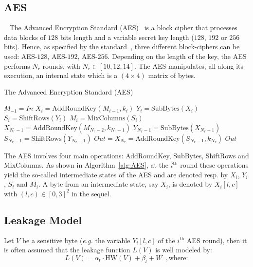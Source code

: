 \subsection{AES}~\label{ssec:AES}
The Advanced Encryption Standard (AES)~\cite{FIPS197} is a  block cipher that processes data blocks of $128$ bits length and a variable secret key length ($128$, $192$ or $256$ bits). Hence, as specified by the standard~\cite{FIPS197}, three different block-ciphers can be used: AES-$128$, AES-$192$, AES-$256$.
Depending on the length of the key, the AES performs $N_r$ rounds, with $N_r \in [10, 12, 14 ]$. The AES manipulates, all along its execution, an internal state which is a $(4 \times 4) $ matrix of bytes.

\begin{algorithm}[ht!]
	\caption{The Advanced Encryption Standard (AES)}\label{alg:AES}
	\begin{algorithmic}[1]
	\State $M_{-1} = In$	
		\State $X_i = \mbox{AddRoundKey}(M_{i-1},k_{i})$
		\State $Y_i = \mbox{SubBytes}(X_{i})$
		\State $S_i = \mbox{ShiftRows}(Y_{i})$
		\State $M_i = \mbox{MixColumns}(S_i)$
    \EndFor
    \State $X_{N_r-1} = \mbox{AddRoundKey}(M_{N_r-2}, k_{N_r-1})$
   	\State $Y_{N_r-1} = \mbox{SubBytes}(X_{N_r-1})$
	\State $S_{N_r-1} = \mbox{ShiftRows}(Y_{N_r-1})$
	\State $Out = X_{N_r} = \mbox{AddRoundKey}(S_{N_r-1}, k_{N_r})$
	\State \Return $Out$
  	\end{algorithmic}
\end{algorithm}

The AES involves four main operations: AddRoundKey, SubBytes, ShiftRows and MixColumns. As shown in Algorithm~\ref{alg:AES}, at the $i^{\text{th}}$ round these operations yield the so-called intermediate states of the AES and are denoted resp. by $X_i$, $Y_i$, $S_i$ and $M_i$. A byte from an intermediate state, say $X_i$, is denoted by ${X_i[l,c]}$ with $(l,c) \in {[0,3]}^2$ in the sequel.


\subsection{Leakage Model}\label{ssec:leak}
Let $V$ be a sensitive byte (\emph{e.g.} the variable $Y_i[l,c]$ of the $i^{\text{th}}$ AES round), then it is often assumed that the leakage function $L(V)$ is well modeled by:
\begin{equation}
L(V) = \alpha_t \cdot \mbox{HW}(V) + \beta_t + W \enspace , \text{where:}
\label{eq:leak}
\end{equation}

